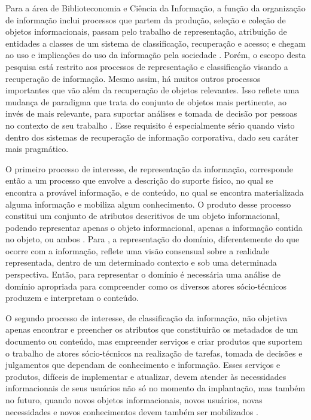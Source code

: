 Para a área de Biblioteconomia e Ciência da Informação, a função da organização de informação inclui processos que partem da produção, seleção e coleção de objetos informacionais, passam pelo trabalho de representação, atribuição de entidades a classes de um sistema de classificação, recuperação e acesso; e chegam ao uso e implicações do uso da informação pela sociedade \cite{solomon2002}. Porém, o escopo desta pesquisa está restrito aos processos de representação e classificação visando a recuperação de informação. Mesmo assim, há muitos outros processos importantes que vão além da recuperação de objetos relevantes. Isso reflete uma mudança de paradigma que trata do conjunto de objetos mais pertinente, ao invés de mais relevante, para suportar análises e tomada de decisão por pessoas no contexto de seu trabalho \cite{solomon2002}. Esse requisito é especialmente sério quando visto dentro dos sistemas de recuperação de informação corporativa, dado seu caráter mais pragmático.

O primeiro processo de interesse, de representação da informação, corresponde então a um processo que envolve a descrição do suporte físico, no qual se encontra a provável informação, e de conteúdo, no qual se encontra materializada alguma informação e mobiliza algum conhecimento. O produto desse processo constitui um conjunto de atributos descritivos de um objeto informacional, podendo representar apenas o objeto informacional, apenas a informação contida no objeto, ou ambos \cite{brascher2008organizacao}. Para , a representação do domínio, diferentemente do que ocorre com a informação, reflete uma visão consensual sobre a realidade representada, dentro de um determinado contexto e sob uma determinada perspectiva. Então, para representar o domínio é necessária uma análise de domínio apropriada para compreender como os diversos atores sócio-técnicos produzem e interpretam o conteúdo.

O segundo processo de interesse, de classificação da informação, não objetiva apenas encontrar e preencher os atributos que constituirão os metadados de um documento ou conteúdo, mas empreender serviços e criar produtos que suportem o trabalho de atores sócio-técnicos na realização de tarefas, tomada de decisões e julgamentos que dependam de conhecimento e informação. Esses serviços e produtos, difíceis de implementar e atualizar, devem atender às necessidades informacionais de seus usuários não só no momento da implantação, mas também no futuro, quando novos objetos informacionais, novos usuários, novas necessidades e novos conhecimentos devem também ser mobilizados \cite{solomon2002}.

